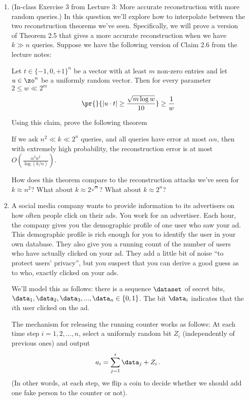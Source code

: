 \documentclass[11pt]{article}
\begin{document}
\begin{enumerate}[leftmargin=\parindent, itemsep=3ex]
\item (In-class Exercise 3 from Lecture 3: More accurate reconstruction with more random queries.)  In this question we'll explore how to interpolate between the two reconstruction theorems we've seen.  Specifically, we will prove a version of Theorem 2.5 that gives a more accurate reconstruction when we have $k \gg n$ queries.  Suppose we have the following version of Claim 2.6 from the lecture notes:
\begin{clm} 
	Let $t \in \{-1,0,+1\}^n$ be a vector with at least $m$ non-zero entries and let $u \in \zo^{n}$ be a uniformly random vector.  Then for every parameter $2 \leq w \ll  2^{m}$
	\begin{equation}
		\pr{}{| u \cdot t | \geq  \frac{\sqrt{m \log w}}{10}} \geq \frac{1}{w}
	\end{equation}
\end{clm}
Using this claim, prove the following theorem
\begin{thm}
	If we ask $n^2 \ll k \ll 2^n$ queries, and all queries have error at most $\alpha n$, then with extremely high probability, the reconstruction error is at most $O(\frac{\alpha^2 n^2}{\log(k/n)})$.
\end{thm}

How does this theorem compare to the reconstruction attacks we've seen for $k \approx n^2$?  What about $k \approx 2^{\sqrt{n}}$?  What about $k \approx 2^n$?
  

\item 
  A social media company wants
  to provide information to its advertisers on how often people click
  on their ads. You work for an advertiser. Each hour, the company
  gives you the demographic profile of one user who saw your ad. This
  demographic profile is rich enough for you to identify the user in
  your own database. They also give you a running count of the number
  of users who have actually clicked on your ad. They add a little bit
  of noise ``to protect users' privacy'', but you suspect that you can
  derive a good guess as to who, exactly clicked on your ads.

  We'll model this as follows: there is a sequence $\dataset$ of secret bits, $\data_1,
 \data_2, \data_3, ..., \data_n \in \{0,1\}$. The bit $\data_i$ indicates that
  the $i$th user clicked on the ad.

  The mechanism for releasing the running counter works as follows: 
  At each time step $i=1, 2, ...,
  n$, select a uniformly random bit $Z_i$ (independently of
  previous ones) and output
  $$a_i = \sum_{j=1}^i \data_j +
  Z_i\,.$$ (In other words, at each step, we flip a coin to decide
  whether we should add one fake person to the counter or not).


\end{enumerate}
\end{document}
